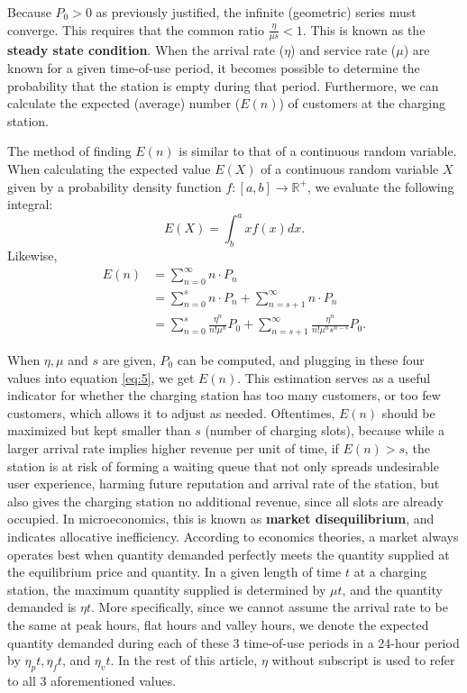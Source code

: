 \documentclass[10pt]{article}
\begin{document}
Because $P_0 > 0$ as previously justified, the infinite (geometric) series must converge. This requires that the common ratio $\frac{\eta}{\mu s} < 1.$ This is known as the \textbf{steady state condition}. When the arrival rate ($\eta$) and service rate ($\mu$) are known for a given time-of-use period, it becomes possible to determine the probability that the station is empty during that period. Furthermore, we can calculate the expected (average) number ($E(n)$) of customers at the charging station.

The method of finding $E(n)$ is similar to that of a continuous random variable. When calculating the expected value $E(X)$ of a continuous random variable $X$ given by a probability density function $f: [a,b] \to \mathbb{R}^+$, we evaluate the following integral:
\begin{equation}
    E(X) = \int_b^a x f\left(x\right) dx.
\end{equation}
Likewise,
\begin{align}
    E(n) & = \sum_{n=0}^\infty n \cdot P_n \\
    & = \sum_{n=0}^s n \cdot P_n + \sum_{n=s+1}^\infty n \cdot P_n \\
    & = \sum_{n=0}^{s}\frac{\eta^n}{n!\mu^n}P_0 + \sum_{n=s+1}^\infty \frac{\eta^n}{n! \mu^n s^{n-s}}P_0.\label{eq:5}
\end{align}

When $\eta,\mu$ and $s$ are given, $P_0$ can be computed, and plugging in these four values into equation \eqref{eq:5}, we get $E(n)$. This estimation serves as a useful indicator for whether the charging station has too many customers, or too few customers, which allows it to adjust as needed. Oftentimes, $E(n)$ should be maximized but kept smaller than $s$ (number of charging slots), because while a larger arrival rate implies higher revenue per unit of time, if $E(n) > s$, the station is at risk of forming a waiting queue that not only spreads undesirable user experience, harming future reputation and arrival rate of the station, but also gives the charging station no additional revenue, since all slots are already occupied. In microeconomics, this is known as \textbf{market disequilibrium}, and indicates allocative inefficiency. According to economics theories, a market always operates best when quantity demanded perfectly meets the quantity supplied at the equilibrium price and quantity. In a given length of time $t$ at a charging station, the maximum quantity supplied is determined by $\mu t$, and the quantity demanded is $\eta t$. More specifically, since we cannot assume the arrival rate to be the same at peak hours, flat hours and valley hours, we denote the expected quantity demanded during each of these 3 time-of-use periods in a 24-hour period by $\eta_p t, \eta_f t$, and $\eta_v t$. In the rest of this article, $\eta$ without subscript is used to refer to all 3 aforementioned values.
\end{document}
